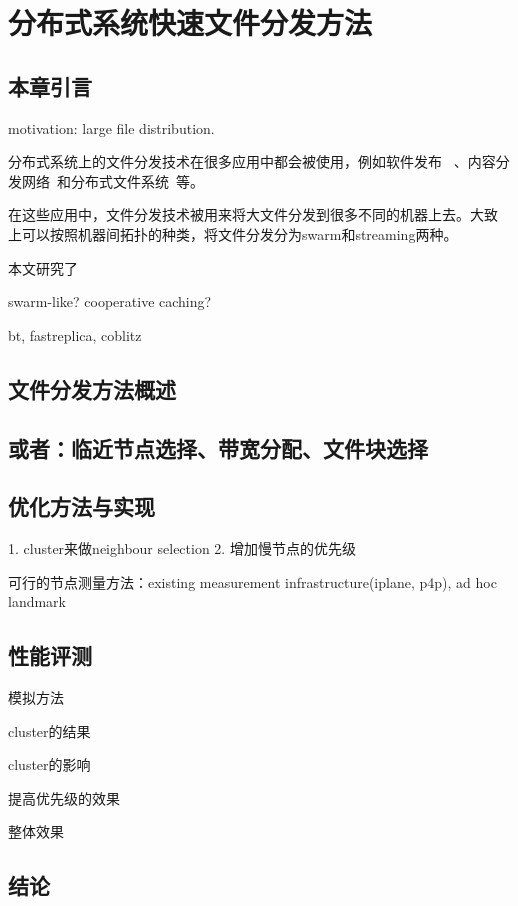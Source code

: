 \chapter{分布式系统快速文件分发方法}
\label{chap:bt}

\section{本章引言}

motivation: large file distribution.

分布式系统上的文件分发技术在很多应用中都会被使用，例如软件发布~
\cite{xxx}、内容分发网络~\cite{xxx}和分布式文件系统~\cite{xxx}等。

在这些应用中，文件分发技术被用来将大文件分发到很多不同的机器上去。大致
上可以按照机器间拓扑的种类，将文件分发分为swarm和streaming两种。

本文研究了

swarm-like? cooperative caching? 

bt, fastreplica, coblitz


\section{文件分发方法概述}


\section{或者：临近节点选择、带宽分配、文件块选择}

\section{优化方法与实现}

1. cluster来做neighbour selection
2. 增加慢节点的优先级

可行的节点测量方法：existing measurement infrastructure(iplane, p4p), ad hoc
landmark

\section{性能评测}

模拟方法

cluster的结果

cluster的影响

提高优先级的效果

整体效果

\section{结论}
